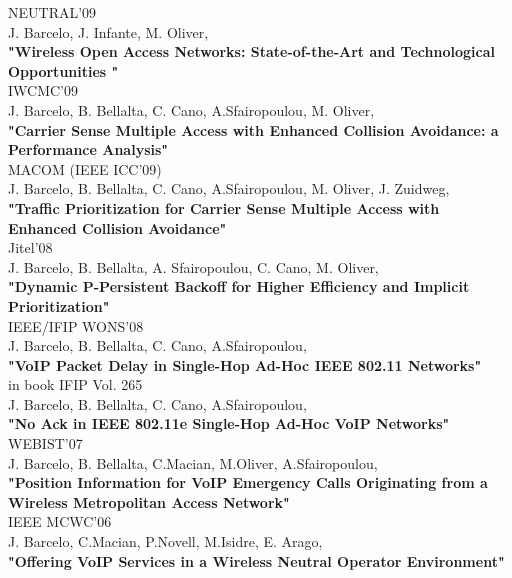 \documentclass[line,margin]{res}
\begin{document}
\begin{resume}
\hfill {NEUTRAL'09} \\
J. Barcelo,  J. Infante, M. Oliver,\\
\textbf{"Wireless Open Access Networks: State-of-the-Art and Technological Opportunities "}\\

\hfill {IWCMC'09} \\
J. Barcelo, B. Bellalta,  C. Cano, A.Sfairopoulou, M. Oliver,\\
\textbf{"Carrier Sense Multiple Access with Enhanced Collision Avoidance: a Performance Analysis"}\\

\hfill {MACOM (IEEE ICC'09)} \\
J. Barcelo, B. Bellalta,  C. Cano, A.Sfairopoulou, M. Oliver, J. Zuidweg,\\
\textbf{"Traffic Prioritization for Carrier Sense Multiple Access with Enhanced Collision Avoidance"}\\

\hfill {Jitel'08} \\
J. Barcelo, B. Bellalta, A. Sfairopoulou, C. Cano, M. Oliver,\\
\textbf{"Dynamic P-Persistent Backoff for Higher Efficiency and Implicit Prioritization"}\\

\hfill {IEEE/IFIP WONS'08} \\
J. Barcelo, B. Bellalta,  C. Cano, A.Sfairopoulou,\\
\textbf{"VoIP Packet Delay in Single-Hop Ad-Hoc IEEE 802.11 Networks"}\\

\hfill {in book IFIP Vol. 265} \\
J. Barcelo, B. Bellalta,  C. Cano, A.Sfairopoulou,\\
\textbf{"No Ack in IEEE 802.11e Single-Hop Ad-Hoc VoIP Networks"}\\

\hfill {WEBIST'07} \\
J. Barcelo, B. Bellalta, C.Macian, M.Oliver, A.Sfairopoulou,\\
\textbf{"Position Information for VoIP Emergency Calls Originating from a Wireless Metropolitan Access Network"}\\

\hfill {IEEE MCWC'06} \\
J. Barcelo, C.Macian, P.Novell, M.Isidre, E. Arago,\\
\textbf{"Offering VoIP Services in a Wireless Neutral Operator Environment"}\\


\end{resume}
\end{document}
